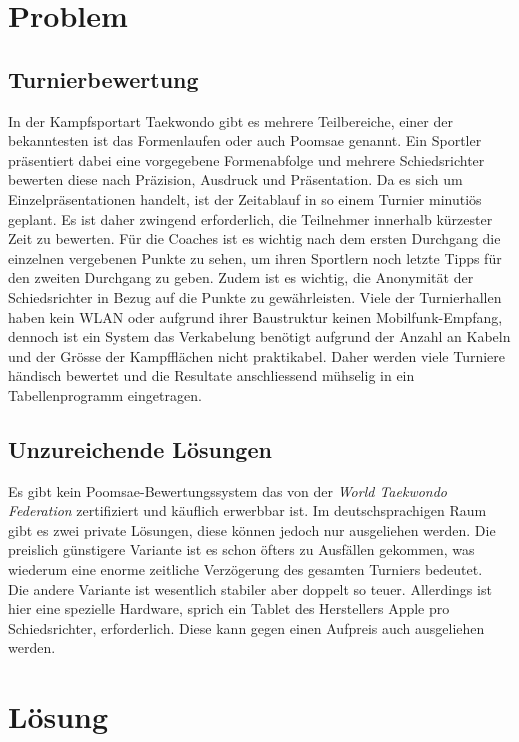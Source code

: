 \section{Problem}

\subsection{Turnierbewertung}
In der Kampfsportart Taekwondo gibt es mehrere Teilbereiche, einer der bekanntesten ist das Formenlaufen oder auch Poomsae genannt.
Ein Sportler präsentiert dabei eine vorgegebene Formenabfolge und mehrere Schiedsrichter bewerten diese nach
Präzision, Ausdruck und Präsentation.
Da es sich um Einzelpräsentationen handelt, ist der Zeitablauf in so einem Turnier minutiös geplant.
Es ist daher zwingend erforderlich, die Teilnehmer innerhalb kürzester Zeit zu bewerten.
Für die Coaches ist es wichtig nach dem ersten Durchgang die einzelnen vergebenen Punkte zu sehen, um ihren Sportlern
    noch letzte Tipps für den zweiten Durchgang zu geben.
Zudem ist es wichtig, die Anonymität der Schiedsrichter in Bezug auf die Punkte zu gewährleisten.
Viele der Turnierhallen haben kein WLAN oder aufgrund ihrer Baustruktur keinen Mobilfunk-Empfang, dennoch ist ein System
das Verkabelung benötigt aufgrund der Anzahl an Kabeln und der Grösse der Kampfflächen nicht praktikabel.
Daher werden viele Turniere händisch bewertet und die Resultate anschliessend mühselig in ein Tabellenprogramm
eingetragen.

\subsection{Unzureichende Lösungen}

Es gibt kein Poomsae-Bewertungssystem das von der \emph{World Taekwondo Federation} zertifiziert und käuflich erwerbbar ist.
Im deutschsprachigen Raum gibt es zwei private Lösungen, diese können jedoch nur ausgeliehen werden.
Die preislich günstigere Variante ist es schon öfters zu Ausfällen gekommen, was wiederum eine enorme zeitliche
Verzögerung des gesamten Turniers bedeutet.
\\
Die andere Variante ist wesentlich stabiler aber doppelt so teuer.
Allerdings ist hier eine spezielle Hardware, sprich ein Tablet des Herstellers Apple pro Schiedsrichter, erforderlich.
Diese kann gegen einen Aufpreis auch ausgeliehen werden.

\section{Lösung}

